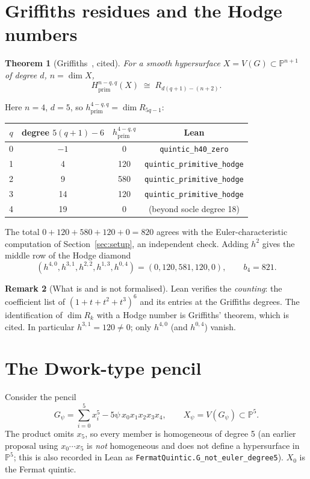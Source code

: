 \documentclass[11pt]{article}
\newtheorem{theorem}{Theorem}[section]\newtheorem{proposition}[theorem]{Proposition}
\theoremstyle{definition}\newtheorem{definition}[theorem]{Definition}\newtheorem{remark}[theorem]{Remark}
\newcommand{\PP}{\mathbb{P}}\newcommand{\CC}{\mathbb{C}}\newcommand{\QQ}{\mathbb{Q}}
\begin{document}
\section{Griffiths residues and the Hodge numbers}\label{sec:hodge}
\begin{theorem}[Griffiths~\cite{Griffiths69}, cited]
For a smooth hypersurface $X=V(G)\subset\PP^{n+1}$ of degree $d$, $n=\dim X$,
\[ H^{n-q,q}_{\mathrm{prim}}(X)\;\cong\;R_{d(q+1)-(n+2)}. \]
\end{theorem}
Here $n=4$, $d=5$, so $h^{4-q,q}_{\mathrm{prim}}=\dim R_{5q-1}$:
\begin{center}\begin{tabular}{cccc}\toprule
$q$ & degree $5(q+1)-6$ & $h^{4-q,q}_{\mathrm{prim}}$ & Lean\\\midrule
0 & $-1$ & 0 & \texttt{quintic\_h40\_zero}\\
1 & 4 & 120 & \texttt{quintic\_primitive\_hodge}\\
2 & 9 & 580 & \texttt{quintic\_primitive\_hodge}\\
3 & 14 & 120 & \texttt{quintic\_primitive\_hodge}\\
4 & 19 & 0 & (beyond socle degree 18)\\\bottomrule
\end{tabular}\end{center}
The total $0+120+580+120+0=820$ agrees with the Euler-characteristic computation of
Section~\ref{sec:setup}, an independent check. Adding $h^2$ gives the middle row of the Hodge diamond
\[ (h^{4,0},h^{3,1},h^{2,2},h^{1,3},h^{0,4})=(0,120,581,120,0),\qquad b_4=821. \]
\begin{remark}[What is and is not formalised]
Lean verifies the \emph{counting}: the coefficient list of $(1+t+t^2+t^3)^6$ and its entries at the
Griffiths degrees. The identification of $\dim R_k$ with a Hodge number is Griffiths' theorem, which is
cited. In particular $h^{3,1}=120\neq0$; only $h^{4,0}$ (and $h^{0,4}$) vanish.
\end{remark}
\section{The Dwork-type pencil}\label{sec:dwork}
Consider the pencil
\[ G_\psi=\sum_{i=0}^5 x_i^5-5\psi\,x_0x_1x_2x_3x_4,\qquad X_\psi=V(G_\psi)\subset\PP^5 .\]
The product omits $x_5$, so every member is homogeneous of degree 5 (an earlier proposal using
$x_0\cdots x_5$ is \emph{not} homogeneous and does not define a hypersurface in $\PP^5$; this is also
recorded in Lean as \texttt{FermatQuintic.G\_not\_euler\_degree5}). $X_0$ is the Fermat quintic.
\end{document}
